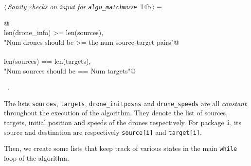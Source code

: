 \documentclass[10pt, english, oneside]{report}
\begin{document}
\begin{flushleft} \small
\begin{minipage}{\linewidth}\label{scrap14}\raggedright\small
{} $\langle\,${\itshape Sanity checks on input for \verb|algo_matchmove|}\nobreak\ {\footnotesize {14b}}$\,\rangle\equiv$
\vspace{-1ex}
\begin{list}{}{} \item
\mbox{}\verb@   @\\
\mbox{}\verb@assert len(drone_info) >= len(sources),\@\\
\mbox{}\verb@   "Num drones should be >= the num source-target pairs"@\\
\mbox{}\verb@@\\
\mbox{}\verb@assert len(sources) == len(targets),\@\\
\mbox{}\verb@   "Num sources should be == Num targets"@\\
\mbox{}\verb@@{\NWsep}
\end{list}
\vspace{-1.5ex}
\footnotesize
\begin{list}{}{\setlength{\itemsep}{-\parsep}\setlength{\itemindent}{-\leftmargin}}
\item \NWtxtMacroRefIn\ .

\item{}
\end{list}
\end{minipage}\vspace{4ex}
\end{flushleft}


The lists \verb|sources|, \verb|targets|, \verb|drone_initposns| and \verb|drone_speeds| 
are all \textit{constant} throughout the execution of the algorithm. They denote the list of sources, 
targets, initial position and speeds of the drones respectively. For package \verb|i|, its source and 
destination are respectively \verb|source[i]| and \verb|target[i]|. 


Then, we create some lists that keep track of various states in the 
main \texttt{while} loop of the algorithm. 
\end{document}
